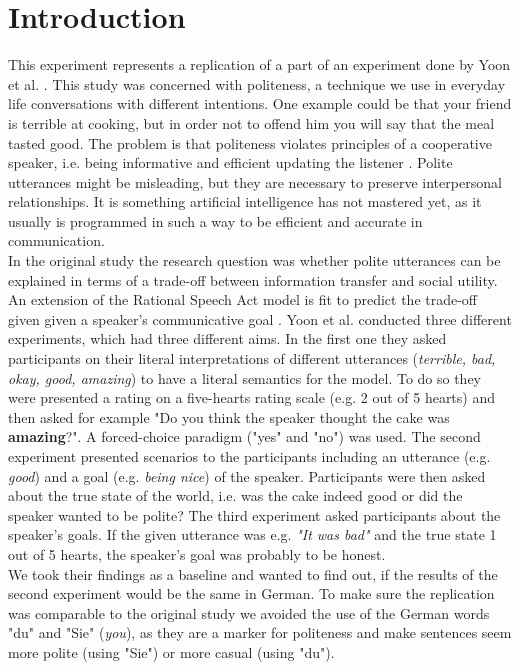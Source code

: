 \documentclass[a4paper,11pt]{article}
\begin{document}
\section{Introduction}
This experiment represents a replication of a part of an experiment done by Yoon et al. \cite{yoon2016talking}. This study was concerned with politeness, a technique we use in everyday life conversations with different intentions. One example could be that your friend is terrible at cooking, but in order not to offend him you will say that the meal tasted good. The problem is that politeness violates principles of a cooperative speaker, i.e. being informative and efficient updating the listener \cite{grice1975logic}. Polite utterances might be misleading, but they are necessary to preserve interpersonal relationships. It is something artificial intelligence has not mastered yet, as it usually is programmed in such a way to be efficient and accurate in communication. \\ In the original study the research question was whether polite utterances can be explained in terms of a trade-off between information transfer and social utility. An extension of the Rational Speech Act model is fit to predict the trade-off given given a speaker's communicative goal \cite{frank2012predicting}.  Yoon et al. \cite{yoon2016talking} conducted three different experiments, which had three different aims. In the first one they asked participants on their literal interpretations of different utterances (\textit{terrible, bad, okay, good, amazing}) to have a literal semantics for the model. To do so they were presented a rating on a five-hearts rating scale (e.g. 2 out of 5 hearts) and then asked for example "Do you think the speaker thought the cake was \textbf{amazing}?". A forced-choice paradigm ("yes" and "no") was used. The second experiment presented scenarios to the participants including an utterance (e.g. \textit{good}) and a goal (e.g. \textit{being nice}) of the speaker. Participants were then asked about the true state of the world, i.e. was the cake indeed good or did the speaker wanted to be polite? The third experiment asked participants about the speaker's goals. If the given utterance was e.g. \textit{"It was bad"} and the true state 1 out of 5 hearts, the speaker's goal was probably to be honest. \\ We took their findings as a baseline and wanted to find out, if the results of the second experiment would be the same in German. To make sure the replication was comparable to the original study we avoided the use of the German words "du" and "Sie" (\textit{you}), as they are a marker for politeness and make sentences seem more polite (using "Sie") or more casual (using "du"). 
\end{document}

